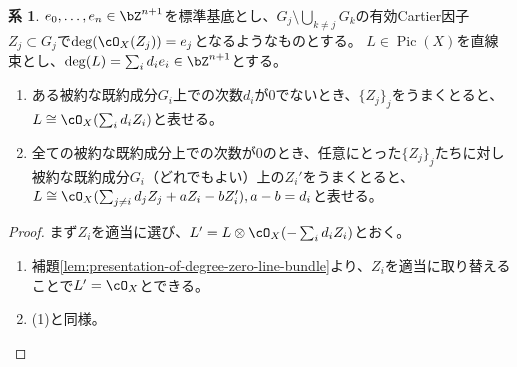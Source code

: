 \documentclass[uplatex, a4paper, dvipdfmx]{jsarticle}
\theoremstyle{definition}
\newtheorem{corollary}[theorem]{系}
\DeclareMathOperator{\Pic}{\mathrm{Pic}}
\begin{document}
\begin{corollary}\label{cor:presentation-of-line-bundle}
    $e_0, \dots, e_n \in \bZ^{n+1}$を標準基底とし、$G_j \setminus \bigcup_{k \neq j} G_k$の有効Cartier因子$Z_j \subset G_j$で$\deg(\cO_X(Z_j)) = e_j$となるようなものとする。
    $L \in \Pic(X)$を直線束とし、$\deg(L) = \sum_i d_ie_i\in \bZ^{n+1}$とする。
    \begin{enumerate}
        \item ある被約な既約成分$G_i$上での次数$d_i$が$0$でないとき、$\{Z_j\}_j$をうまくとると、$L \cong \cO_X(\sum_i d_iZ_i)$と表せる。
        \item 全ての被約な既約成分上での次数が$0$のとき、任意にとった$\{Z_j\}_j$たちに対し被約な既約成分$G_i$（どれでもよい）上の$Z_i'$をうまくとると、$L \cong \cO_X(\sum_{j \neq i} d_jZ_j + aZ_i - bZ_i'), a-b = d_i$と表せる。
    \end{enumerate}
\end{corollary}
\begin{proof}
    まず$Z_i$を適当に選び、$L' = L \otimes \cO_X(-\sum_i d_iZ_i)$とおく。
    \begin{enumerate}
        \item 補題\ref{lem:presentation-of-degree-zero-line-bundle}より、$Z_i$を適当に取り替えることで$L' = \cO_X$とできる。
        \item (1)と同様。
    \end{enumerate}
\end{proof}
\end{document}
